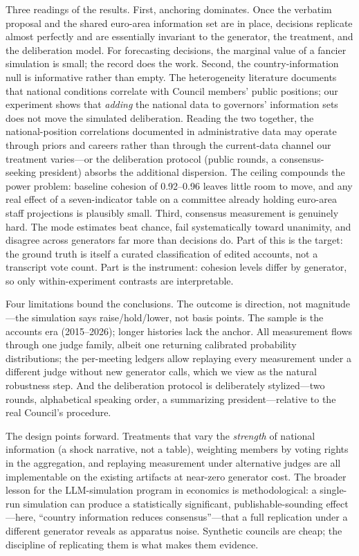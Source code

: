 \documentclass[11pt,a4paper]{article}
\begin{document}
Three readings of the results. First, anchoring dominates. Once the verbatim proposal and the shared euro-area information set are in place, decisions replicate almost perfectly and are essentially invariant to the generator, the treatment, and the deliberation model. For forecasting decisions, the marginal value of a fancier simulation is small; the record does the work. Second, the country-information null is informative rather than empty. The heterogeneity literature documents that national conditions correlate with Council members' public positions; our experiment shows that \emph{adding} the national data to governors' information sets does not move the simulated deliberation. Reading the two together, the national-position correlations documented in administrative data may operate through priors and careers rather than through the current-data channel our treatment varies---or the deliberation protocol (public rounds, a consensus-seeking president) absorbs the additional dispersion. The ceiling compounds the power problem: baseline cohesion of 0.92--0.96 leaves little room to move, and any real effect of a seven-indicator table on a committee already holding euro-area staff projections is plausibly small. Third, consensus measurement is genuinely hard. The mode estimates beat chance, fail systematically toward unanimity, and disagree across generators far more than decisions do. Part of this is the target: the ground truth is itself a curated classification of edited accounts, not a transcript vote count. Part is the instrument: cohesion levels differ by generator, so only within-experiment contrasts are interpretable.

Four limitations bound the conclusions. The outcome is direction, not magnitude---the simulation says raise/hold/lower, not basis points. The sample is the accounts era (2015--2026); longer histories lack the anchor. All measurement flows through one judge family, albeit one returning calibrated probability distributions; the per-meeting ledgers allow replaying every measurement under a different judge without new generator calls, which we view as the natural robustness step. And the deliberation protocol is deliberately stylized---two rounds, alphabetical speaking order, a summarizing president---relative to the real Council's procedure.

The design points forward. Treatments that vary the \emph{strength} of national information (a shock narrative, not a table), weighting members by voting rights in the aggregation, and replaying measurement under alternative judges are all implementable on the existing artifacts at near-zero generator cost. The broader lesson for the LLM-simulation program in economics is methodological: a single-run simulation can produce a statistically significant, publishable-sounding effect---here, ``country information reduces consensus''---that a full replication under a different generator reveals as apparatus noise. Synthetic councils are cheap; the discipline of replicating them is what makes them evidence.
\end{document}
